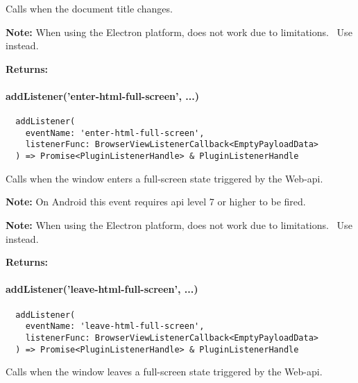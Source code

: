 Calls  when the document title changes.

\textbf{Note:} When using the Electron platform,  does not work due to limitations.~\cite{capacitor-electron}
Use  instead.

\textbf{Returns:} 


\paragraph{addListener('enter-html-full-screen', ...)}

\begin{verbatim}
  addListener(
    eventName: 'enter-html-full-screen',
    listenerFunc: BrowserViewListenerCallback<EmptyPayloadData>
  ) => Promise<PluginListenerHandle> & PluginListenerHandle
\end{verbatim}

Calls  when the window enters a full-screen state triggered by the Web-\acs{api}.

\textbf{Note:} On Android this event requires \ac{api} level 7 or higher to be fired.~\cite{android:api}

\textbf{Note:} When using the Electron platform,  does not work due to limitations.~\cite{capacitor-electron}
Use  instead.

\textbf{Returns:} 


\newpage

\paragraph{addListener('leave-html-full-screen', ...)}

\begin{verbatim}
  addListener(
    eventName: 'leave-html-full-screen',
    listenerFunc: BrowserViewListenerCallback<EmptyPayloadData>
  ) => Promise<PluginListenerHandle> & PluginListenerHandle
\end{verbatim}

Calls  when the window leaves a full-screen state triggered by the Web-\acs{api}.

